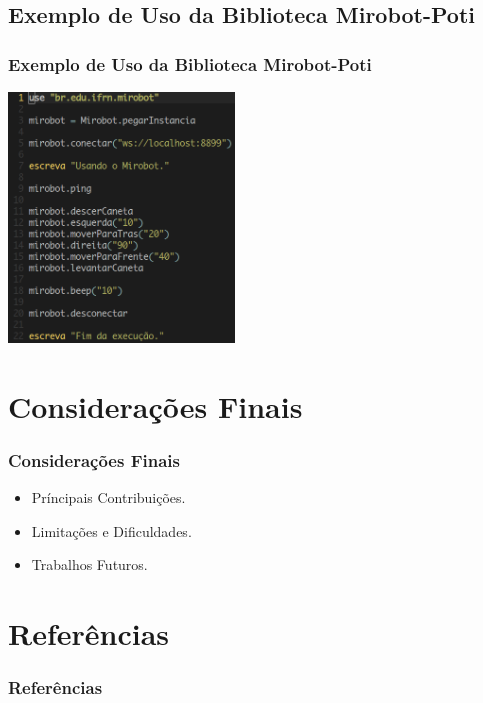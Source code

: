 \documentclass{beamer}
\begin{document}
\begin{frame}
  \subsection{Exemplo de Uso da Biblioteca Mirobot-Poti}
  \label{exemplo}
  \frametitle{Exemplo de Uso da Biblioteca Mirobot-Poti}
   \begin{center}
     \includegraphics[width=6cm]{imagens/teste-potigol.png}
   \end{center}
\end{frame}

\begin{frame}
  \label{consideracoes}
  \section{Considerações Finais}
  \frametitle{Considerações Finais}
    \begin{itemize}
    \item Príncipais Contribuições.
    \item Limitações e Dificuldades.
    \item Trabalhos Futuros.
    \end{itemize}
\end{frame}

\begin{frame}
  \label{referencias}
  \section{Referências}
  \frametitle{Referências}
  
  
\end{frame}
\end{document}
